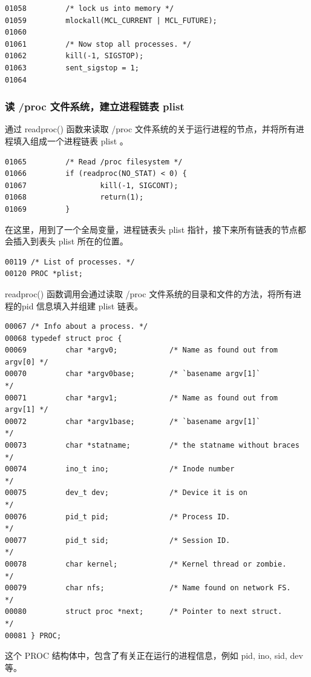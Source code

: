 {\begin{shaded}\begin{verbatim}
01058         /* lock us into memory */
01059         mlockall(MCL_CURRENT | MCL_FUTURE);
01060 
01061         /* Now stop all processes. */
01062         kill(-1, SIGSTOP);
01063         sent_sigstop = 1;
01064 
\end{verbatim}\end{shaded}}
\subsubsection{读 /proc 文件系统，建立进程链表 plist}

通过 readproc() 函数来读取 /proc
文件系统的关于运行进程的节点，并将所有进程填入组成一个进程链表 plist 。

{\begin{shaded}\begin{verbatim}
01065         /* Read /proc filesystem */
01066         if (readproc(NO_STAT) < 0) {
01067                 kill(-1, SIGCONT);
01068                 return(1);
01069         }
\end{verbatim}\end{shaded}}
在这里，用到了一个全局变量，进程链表头 plist
指针，接下来所有链表的节点都会插入到表头 plist 所在的位置。

{\begin{shaded}\begin{verbatim}
00119 /* List of processes. */
00120 PROC *plist;
\end{verbatim}\end{shaded}}
readproc() 函数调用会通过读取 /proc
文件系统的目录和文件的方法，将所有进程的pid 信息填入并组建 plist 链表。

{\begin{shaded}\begin{verbatim}
00067 /* Info about a process. */
00068 typedef struct proc {
00069         char *argv0;            /* Name as found out from argv[0] */
00070         char *argv0base;        /* `basename argv[1]`             */
00071         char *argv1;            /* Name as found out from argv[1] */
00072         char *argv1base;        /* `basename argv[1]`             */
00073         char *statname;         /* the statname without braces    */
00074         ino_t ino;              /* Inode number                   */
00075         dev_t dev;              /* Device it is on                */
00076         pid_t pid;              /* Process ID.                    */
00077         pid_t sid;              /* Session ID.                    */
00078         char kernel;            /* Kernel thread or zombie.       */
00079         char nfs;               /* Name found on network FS.      */
00080         struct proc *next;      /* Pointer to next struct.        */
00081 } PROC;
\end{verbatim}\end{shaded}}
这个 PROC 结构体中，包含了有关正在运行的进程信息，例如 pid, ino, sid, dev
等。

